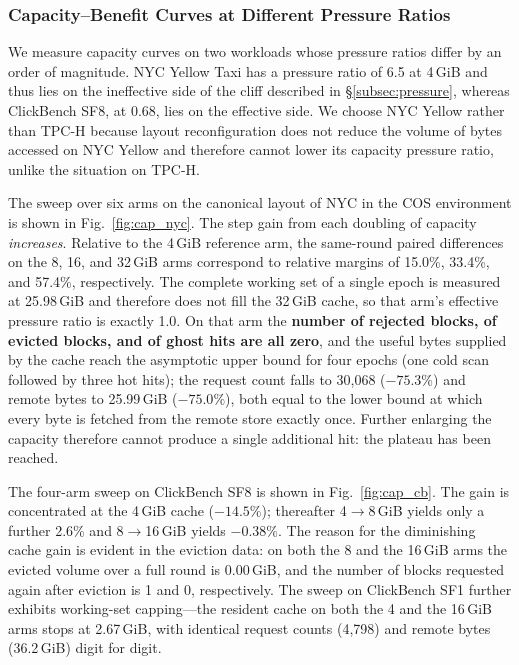 \subsubsection{Capacity--Benefit Curves at Different Pressure Ratios}

We measure capacity curves on two workloads whose pressure ratios differ by an
order of magnitude. NYC Yellow Taxi has a pressure ratio of 6.5 at 4\,GiB and
thus lies on the ineffective side of the cliff described in
\S\ref{subsec:pressure}, whereas ClickBench SF8, at 0.68, lies on the effective
side. We choose NYC Yellow rather than TPC-H because layout reconfiguration does
not reduce the volume of bytes accessed on NYC Yellow and therefore cannot lower
its capacity pressure ratio, unlike the situation on TPC-H.

The sweep over six arms on the canonical layout of NYC in the COS environment is
shown in Fig.~\ref{fig:cap_nyc}. The step gain from each doubling of capacity
\emph{increases}. Relative to the 4\,GiB reference arm, the same-round paired
differences on the 8, 16, and 32\,GiB arms correspond to relative margins of
15.0\%, 33.4\%, and 57.4\%, respectively. The complete working set of a single
epoch is measured at 25.98\,GiB and therefore does not fill the 32\,GiB cache,
so that arm's effective pressure ratio is exactly 1.0. On that arm the
\textbf{number of rejected blocks, of evicted blocks, and of ghost hits are all
zero}, and the useful bytes supplied by the cache reach the asymptotic upper
bound for four epochs (one cold scan followed by three hot hits); the request
count falls to 30{,}068 ($-75.3\%$) and remote bytes to 25.99\,GiB ($-75.0\%$),
both equal to the lower bound at which every byte is fetched from the remote
store exactly once. Further enlarging the capacity therefore cannot produce a
single additional hit: the plateau has been reached.

The four-arm sweep on ClickBench SF8 is shown in Fig.~\ref{fig:cap_cb}. The gain
is concentrated at the 4\,GiB cache ($-14.5\%$); thereafter 4$\to$8\,GiB yields
only a further 2.6\% and 8$\to$16\,GiB yields $-0.38\%$. The reason for the
diminishing cache gain is evident in the eviction data: on both the 8 and the
16\,GiB arms the evicted volume over a full round is 0.00\,GiB, and the number of
blocks requested again after eviction is 1 and 0, respectively. The sweep on
ClickBench SF1 further exhibits working-set capping---the resident cache on both
the 4 and the 16\,GiB arms stops at 2.67\,GiB, with identical request counts
(4{,}798) and remote bytes (36.2\,GiB) digit for digit.

